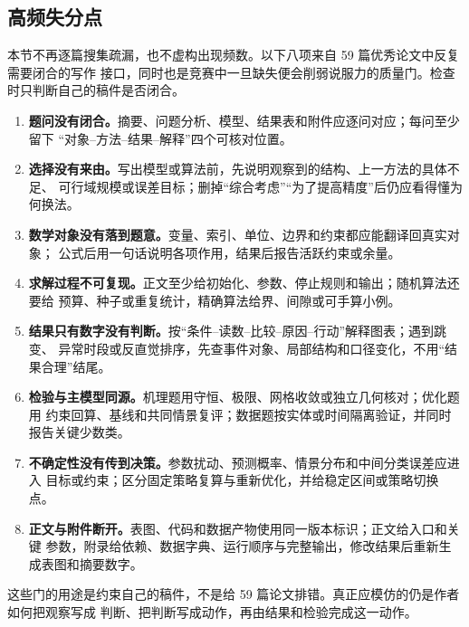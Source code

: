 \subsection{高频失分点}

本节不再逐篇搜集疏漏，也不虚构出现频数。以下八项来自 59 篇优秀论文中反复需要闭合的写作
接口，同时也是竞赛中一旦缺失便会削弱说服力的质量门。检查时只判断自己的稿件是否闭合。

\begin{enumerate}
  \item \textbf{题问没有闭合。}摘要、问题分析、模型、结果表和附件应逐问对应；每问至少留下
  “对象--方法--结果--解释”四个可核对位置。
  \item \textbf{选择没有来由。}写出模型或算法前，先说明观察到的结构、上一方法的具体不足、
  可行域规模或误差目标；删掉“综合考虑”“为了提高精度”后仍应看得懂为何换法。
  \item \textbf{数学对象没有落到题意。}变量、索引、单位、边界和约束都应能翻译回真实对象；
  公式后用一句话说明各项作用，结果后报告活跃约束或余量。
  \item \textbf{求解过程不可复现。}正文至少给初始化、参数、停止规则和输出；随机算法还要给
  预算、种子或重复统计，精确算法给界、间隙或可手算小例。
  \item \textbf{结果只有数字没有判断。}按“条件--读数--比较--原因--行动”解释图表；遇到跳变、
  异常时段或反直觉排序，先查事件对象、局部结构和口径变化，不用“结果合理”结尾。
  \item \textbf{检验与主模型同源。}机理题用守恒、极限、网格收敛或独立几何核对；优化题用
  约束回算、基线和共同情景复评；数据题按实体或时间隔离验证，并同时报告关键少数类。
  \item \textbf{不确定性没有传到决策。}参数扰动、预测概率、情景分布和中间分类误差应进入
  目标或约束；区分固定策略复算与重新优化，并给稳定区间或策略切换点。
  \item \textbf{正文与附件断开。}表图、代码和数据产物使用同一版本标识；正文给入口和关键
  参数，附录给依赖、数据字典、运行顺序与完整输出，修改结果后重新生成表图和摘要数字。
\end{enumerate}

这些门的用途是约束自己的稿件，不是给 59 篇论文排错。真正应模仿的仍是作者如何把观察写成
判断、把判断写成动作，再由结果和检验完成这一动作。
